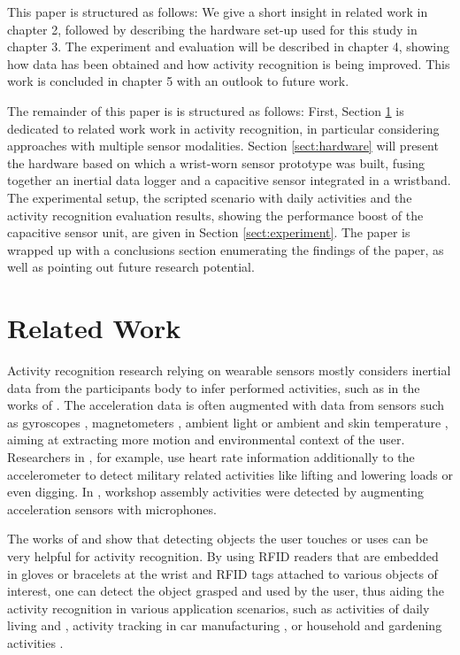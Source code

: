 \documentclass[runningheads,a4paper]{llncs}
\begin{document}
This paper is structured as follows: We give a short insight in related work in chapter 2, followed by describing the hardware set-up used for this study in chapter 3. The experiment and evaluation will be described in chapter 4, showing how data has been obtained and how activity recognition is being improved. This work is concluded in chapter 5 with an outlook to future work.

The remainder of this paper is  is structured as follows: First, Section \ref{sect:related} is dedicated to related work work in activity recognition, in particular considering approaches with multiple sensor modalities. Section \ref{sect:hardware} will present the hardware based on which a wrist-worn sensor prototype was built, fusing together an inertial data logger and a capacitive sensor integrated in a wristband. The experimental setup, the scripted scenario with daily activities and the activity recognition evaluation results, showing the performance boost of the capacitive sensor unit, are given in Section \ref{sect:experiment}. The paper is wrapped up with a conclusions section enumerating the findings of the paper, as well as pointing out future research potential.




\section{Related Work}
\label{sect:related}

Activity recognition research relying on wearable sensors mostly considers inertial data from the participants body to infer performed activities, such as in the works of \cite{Ravi2005,Bao2004,Srinivasan2010,Amft2005}. The acceleration data is often augmented with data from sensors such as gyroscopes \cite{Holleczek_2010}, magnetometers \cite{Altun_2010}, ambient light \cite{Borazio2012} or ambient and skin temperature \cite{Krause_2003}, aiming at extracting more motion and environmental context of the user. Researchers in \cite{wyss2010recognition}, for example, use heart rate information additionally to the accelerometer to detect military related activities like lifting and lowering loads or even digging. In \cite{Ward_2006}, workshop assembly activities were detected by augmenting acceleration sensors with microphones.

The works of \cite{Fishkin_2005} and \cite{patterson2005fga} show that detecting objects the user touches or uses can be very helpful for activity recognition. By using RFID readers that are embedded in gloves or bracelets at the wrist and RFID tags attached to various objects of interest, one can detect the object grasped and used by the user, thus aiding the activity recognition in various application scenarios, such as activities of daily living \cite{phealth:maja} and \cite{Philipose_2004}, activity tracking in car manufacturing \cite{Stiefmeier08}, or household and gardening activities \cite{berlin_laerhoven_tei_2010}. 
\end{document}
